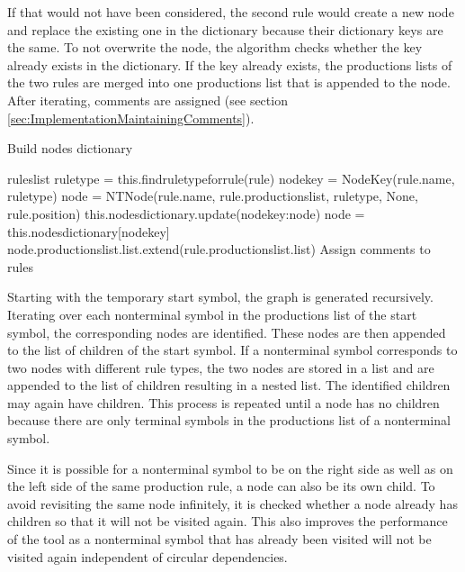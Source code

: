 If that would not have been considered, the second rule would create a new node and replace the existing one in the dictionary because their dictionary keys are the same. To not overwrite the node, the algorithm checks whether the key already exists in the dictionary. If the key already exists, the productions lists of the two rules are merged into one productions list that is appended to the node. 
After iterating, comments are assigned (see section \ref{sec:ImplementationMaintainingComments}).

\begin{algorithm}[H]
\caption{Build nodes dictionary}\label{alg:buildNodesDictionary}
\begin{algorithmic}[1] 
\Require rules\textunderscore list
		\State rule\textunderscore type = this.find\textunderscore rule\textunderscore type\textunderscore for\textunderscore rule(rule)
		\State node\textunderscore key = Node\textunderscore Key(rule.name, rule\textunderscore type)
			\State node = NTNode(rule.name, rule.productions\textunderscore list, rule\textunderscore type, None, rule.position)
			\State this.nodes\textunderscore dictionary.update({node\textunderscore key:node})
		\Else
			\State node = this.nodes\textunderscore dictionary[node\textunderscore key]
			\State node.productions\textunderscore list.list.extend(rule.productions\textunderscore list.list)
		\EndIf
	\EndIf
\EndFor
\State Assign comments to rules
\end{algorithmic}
\end{algorithm}

Starting with the temporary start symbol, the graph is generated recursively. Iterating over each nonterminal symbol in the productions list of the start symbol, the corresponding nodes are identified. These nodes are then appended to the list of children of the start symbol. If a nonterminal symbol corresponds to two nodes with different rule types, the two nodes are stored in a list and are appended to the list of children resulting in a nested list. The identified children may again have children. This process is repeated until a node has no children because there are only terminal symbols in the productions list of a nonterminal symbol.

Since it is possible for a nonterminal symbol to be on the right side as well as on the left side of the same production rule, a node can also be its own child. To avoid revisiting the same node infinitely, it is checked whether a node already has children so that it will not be visited again. This also improves the performance of the tool as a nonterminal symbol that has already been visited will not be visited again independent of circular dependencies.


